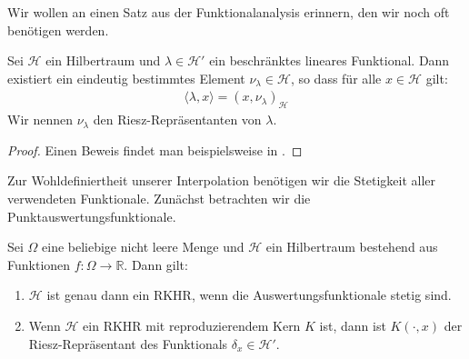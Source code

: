 Wir wollen an einen Satz aus der Funktionalanalysis erinnern, den wir noch oft benötigen werden.

\begin{theorem}
Sei $\mathcal{H}$ ein Hilbertraum und $\lambda \in \mathcal{H}'$ ein beschränktes lineares Funktional. Dann existiert ein eindeutig bestimmtes Element $\nu_\lambda \in \mathcal{H}$, so dass für alle $x \in \mathcal{H}$ gilt:
\begin{align*}
\langle \lambda, x \rangle = \left( x, \nu_\lambda \right)_\mathcal{H}
\end{align*}
Wir nennen $\nu_\lambda$ den Riesz-Repräsentanten von $\lambda$.

\end{theorem}
\begin{proof}
	Einen Beweis findet man beispielsweise in \textcite[Satz 7.3]{Kaballo.2018}.
\end{proof}

Zur Wohldefiniertheit unserer Interpolation benötigen wir die Stetigkeit aller verwendeten Funktionale. Zunächst betrachten wir die Punktauswertungsfunktionale.

\begin{theorem}
\label{stetig}
Sei $\Omega$ eine beliebige nicht leere Menge und $\mathcal{H}$ ein Hilbertraum bestehend aus Funktionen $f: \Omega \rightarrow \mathbb{R}$. Dann gilt:
\begin{enumerate}
\item \label{stetig1} $\mathcal{H}$ ist genau dann ein \ac{RKHR}, wenn die Auswertungsfunktionale stetig sind.
\item \label{stetig2} Wenn $\mathcal{H}$ ein \ac{RKHR} mit reproduzierendem Kern $K$ ist, dann ist $K(\cdot,x)$ der Riesz-Repräsentant des Funktionals $\delta_x \in \mathcal{H}'$.
\end{enumerate}
\end{theorem}

